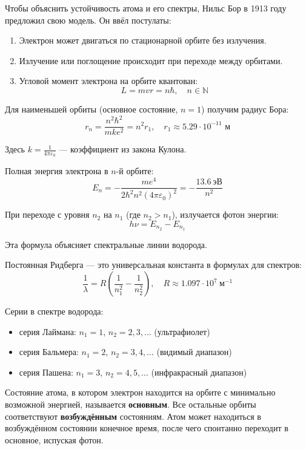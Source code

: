 \documentclass[12pt]{article}
\begin{document}
Чтобы объяснить устойчивость атома и его спектры, Нильс Бор в 1913 году предложил свою модель. Он ввёл постулаты:

\begin{enumerate}
    \item Электрон может двигаться по стационарной орбите без излучения.
    \item Излучение или поглощение происходит при переходе между орбитами.
    \item Угловой момент электрона на орбите квантован:
    \[
    L = m v r = n \hbar, \quad n \in \mathbb{N}
    \]
\end{enumerate}

Для наименьшей орбиты (основное состояние, $n = 1$) получим радиус Бора:
\[
r_n = \frac{n^2 \hbar^2}{m k e^2} = n^2 r_1, \quad r_1 \approx 5.29 \cdot 10^{-11} \text{ м}
\]

Здесь $k = \frac{1}{4\pi\varepsilon_0}$ — коэффициент из закона Кулона.

Полная энергия электрона в $n$-й орбите:
\[
E_n = - \frac{m e^4}{2 \hbar^2 n^2 (4 \pi \varepsilon_0)^2} = -\frac{13.6\ \text{эВ}}{n^2}
\]

При переходе с уровня $n_2$ на $n_1$ (где $n_2 > n_1$), излучается фотон энергии:
\[
h \nu = E_{n_2} - E_{n_1}
\]

Эта формула объясняет спектральные линии водорода.

Постоянная Ридберга — это универсальная константа в формулах для спектров:
\[
\frac{1}{\lambda} = R \left( \frac{1}{n_1^2} - \frac{1}{n_2^2} \right), \quad R \approx 1.097 \cdot 10^7\ \text{м}^{-1}
\]

Серии в спектре водорода:

\begin{itemize}
    \item серия Лаймана: $n_1 = 1$, $n_2 = 2, 3, \ldots$ (ультрафиолет)  
    \item серия Бальмера: $n_1 = 2$, $n_2 = 3, 4, \ldots$ (видимый диапазон)  
    \item серия Пашена: $n_1 = 3$, $n_2 = 4, 5, \ldots$ (инфракрасный диапазон)
\end{itemize}

Состояние атома, в котором электрон находится на орбите с минимально возможной энергией, называется \textbf{основным}. Все остальные орбиты соответствуют \textbf{возбуждённым} состояниям. Атом может находиться в возбуждённом состоянии конечное время, после чего спонтанно переходит в основное, испуская фотон.
\end{document}
